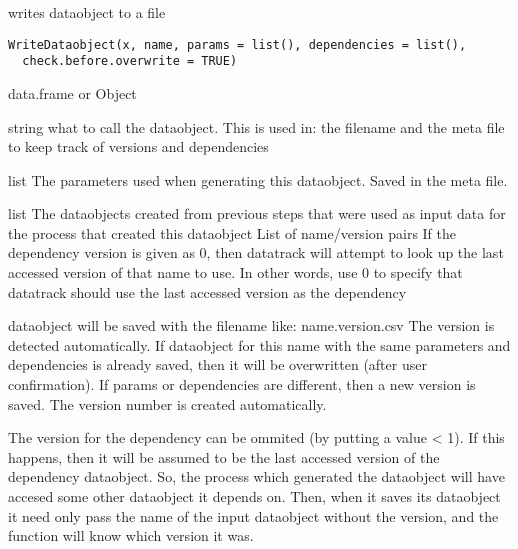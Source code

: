 \documentclass[a4paper]{book}
\begin{document}
%
\begin{Description}\relax
writes dataobject to a file
\end{Description}
%
\begin{Usage}
\begin{verbatim}
WriteDataobject(x, name, params = list(), dependencies = list(),
  check.before.overwrite = TRUE)
\end{verbatim}
\end{Usage}
%
\begin{Arguments}
\begin{ldescription}
\item[\code{x}] data.frame or Object

\item[\code{name}] string what to call the dataobject. This is used in: the filename and the meta file to keep track of versions and dependencies

\item[\code{params}] list The parameters used when generating this dataobject. Saved in the meta file.

\item[\code{dependencies}] list The dataobjects created from previous steps that were used as input data for the process that created this dataobject List of name/version pairs
If the dependency version is given as 0, then datatrack will attempt to look up the last accessed version of that name to use. In other words, use 0 to
specify that datatrack should use the last accessed version as the dependency
\end{ldescription}
\end{Arguments}
%
\begin{Details}\relax
dataobject will be saved with the filename like: name.version.csv  The version is detected automatically.
If dataobject for this name with the same parameters and dependencies is already saved, then it will be overwritten (after user confirmation).
If params or dependencies are different, then a new version is saved. The version number is created automatically.

The version for the dependency can be ommited (by putting a value < 1). If this happens, then it will be assumed to be the last accessed version
of the dependency dataobject. So, the process which generated the dataobject will have accesed some other dataobject it depends on. Then, when it saves its dataobject
it need only pass the name of the input dataobject without the version, and the function will know which version it was.
\end{Details}
\end{document}
